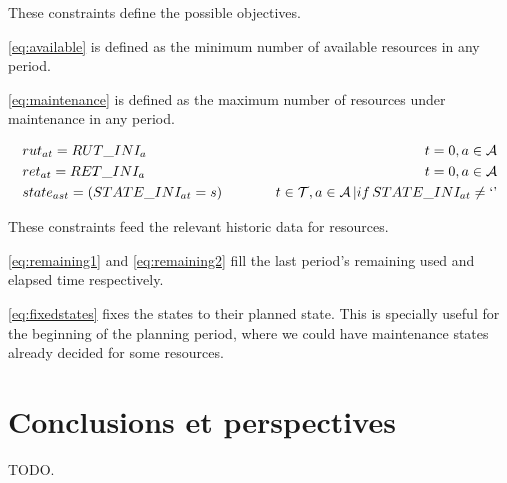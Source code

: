 \documentclass{roadef}
\newcommand{\mq}[1] {`#1\textrm'}
\begin{document}
    These constraints define the possible objectives.

    \ref{eq:available} is defined as the minimum number of available resources in any period.

    \ref{eq:maintenance} is defined as the maximum number of resources under maintenance in any period.

    \begin{align}
        & rut_{at} = RUT\_INI_a
                & \hspace{10mm} t = 0, a \in \mathcal{A} \label{eq:remaining1}\\
        & ret_{at} = RET\_INI_a
                & \hspace{10mm} t = 0, a \in \mathcal{A} \label{eq:remaining2}\\
        & state_{ast} = (STATE\_INI_{at} = s)
                & \hspace{10mm} t \in \mathcal{T}, a \in \mathcal{A}\, | if\, STATE\_INI_{at} \neq \mq{} \label{eq:fixedstates}\\
    \end{align}

    These constraints feed the relevant historic data for resources.

    \ref{eq:remaining1} and \ref{eq:remaining2} fill the last period's remaining used and elapsed time respectively.

    \ref{eq:fixedstates} fixes the states to their planned state. This is specially useful for the beginning of the planning period, where we could have maintenance states already decided for some resources.


\section{Conclusions et perspectives}
    
    TODO.







\end{document}
